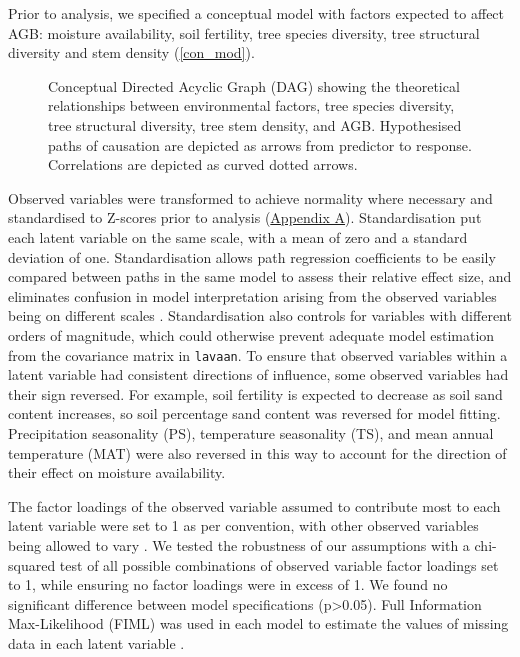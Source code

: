 \documentclass[11pt,a4paper]{article}
\begin{document}
Prior to analysis, we specified a conceptual model with factors expected to affect AGB: moisture availability, soil fertility, tree species diversity, tree structural diversity and stem density (\autoref{con_mod}). 

\begin{figure}[H]
\centering
	
	\caption{Conceptual Directed Acyclic Graph (DAG) showing the theoretical relationships between environmental factors, tree species diversity, tree structural diversity, tree stem density, and AGB. Hypothesised paths of causation are depicted as arrows from predictor to response. Correlations are depicted as curved dotted arrows.}
	\label{con_mod}
\end{figure}

Observed variables were transformed to achieve normality where necessary and standardised to Z-scores prior to analysis (\hyperref[appendixa]{Appendix A}). Standardisation put each latent variable on the same scale, with a mean of zero and a standard deviation of one. Standardisation allows path regression coefficients to be easily compared between paths in the same model to assess their relative effect size, and eliminates confusion in model interpretation arising from the observed variables being on different scales \citep{Beaujean2014}. Standardisation also controls for variables with different orders of magnitude, which could otherwise prevent adequate model estimation from the covariance matrix in \verb|lavaan|. To ensure that observed variables within a latent variable had consistent directions of influence, some observed variables had their sign reversed. For example, soil fertility is expected to decrease as soil sand content increases, so soil percentage sand content was reversed for model fitting. Precipitation seasonality (PS), temperature seasonality (TS), and mean annual temperature (MAT) were also reversed in this way to account for the direction of their effect on moisture availability.


The factor loadings of the observed variable assumed to contribute most to each latent variable were set to 1 as per convention, with other observed variables being allowed to vary \citep{Beaujean2014}.  We tested the robustness of our assumptions with a chi-squared test of all possible combinations of observed variable factor loadings set to 1, while ensuring no factor loadings were in excess of 1. We found no significant difference between model specifications (p>0.05). Full Information Max-Likelihood (FIML) was used in each model to estimate the values of missing data in each latent variable \citep{Cham2017}.
\end{document}
